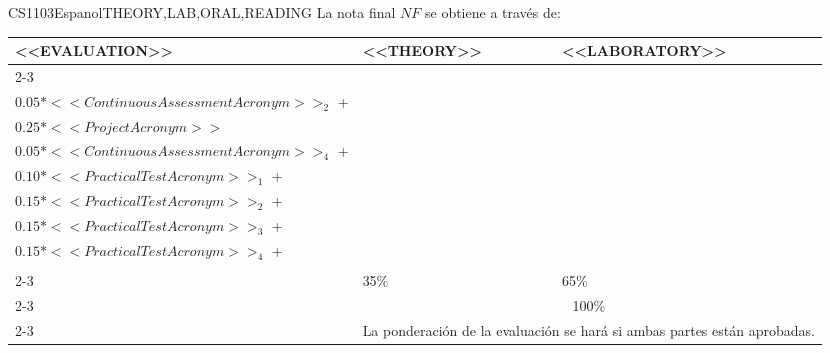  
  \begin{evaluation}{CS1103}{Espanol}{THEORY,LAB,ORAL,READING}
  La nota final $NF$ se obtiene a través de:

  \begin{tabularx}{0.9\textwidth}{|X|p{}|p{}|} \hline
  \multirow{4}{*}{\uppercase{<<Evaluation>>}} & \uppercase{<<Theory>>} & \uppercase{<<Laboratory>>} \\ \cline{2-3}
  & %
      \begin{minipage}{0.95\textwidth}
      \begin{tabular}{l}
          $0.05*<<ContinuousAssessmentAcronym>>_{1}$  + \\
          $0.05*<<ContinuousAssessmentAcronym>>_{2}$  + \\
          $0.25*<<ProjectAcronym>>$
          \end{tabular} 
      \end{minipage} 
  & %
      \begin{minipage}{0.95\textwidth}
      \begin{tabular}{l}
        $0.05*<<ContinuousAssessmentAcronym>>_{3}$ + \\
        $0.05*<<ContinuousAssessmentAcronym>>_{4}$ + \\
        $0.10*<<PracticalTestAcronym>>_{1}$ + \\
        $0.15*<<PracticalTestAcronym>>_{2}$ + \\
        $0.15*<<PracticalTestAcronym>>_{3}$ + \\
        $0.15*<<PracticalTestAcronym>>_{4}$ + \\
      \end{tabular} 
      \end{minipage}                 \\ \cline{2-3}
  & %
  35\% 
  & %
  65\% \\ \cline{2-3}
  & \multicolumn{2}{|c|}{100\%}  \\ \cline{2-3}
  & \multicolumn{2}{|c|}{La ponderación de la evaluación se hará si ambas partes están aprobadas.}  \\ \hline
  \end{tabularx}
    

\end{evaluation}
